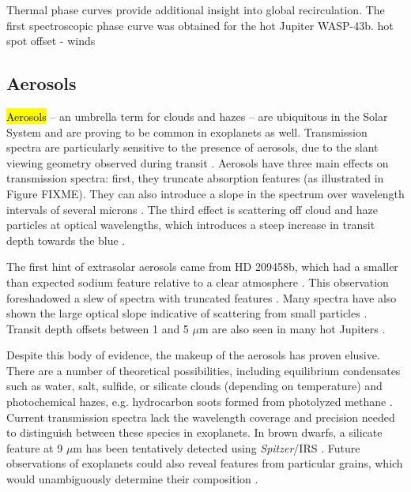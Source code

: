 \documentclass[graybox,natbib,nosecnum]{svmult}
\newcommand{\hbindex}[1]{\hl{#1}\index{#1}}  %
\newcommand{\project}[1]{\textsl{#1}}
\newcommand{\Spitzer}{\project{Spitzer}}
\begin{document}
Thermal phase curves provide additional insight into global recirculation.
The first spectroscopic phase curve was obtained for the hot Jupiter WASP-43b.  
hot spot offset - winds


\subsection{Aerosols}
\hbindex{Aerosols} -- an umbrella term for clouds and hazes -- are ubiquitous in the Solar System and are proving to be common in exoplanets as well. Transmission spectra are particularly sensitive to the presence of aerosols, due to the slant viewing geometry observed during transit \citep{fortney05}.  Aerosols have three main effects on transmission spectra:  first, they truncate absorption features (as illustrated in Figure FIXME).  They can also introduce a slope in the spectrum over wavelength intervals of several microns \citep[e.g][]{sing16}.  The third effect is scattering off cloud and haze particles at optical wavelengths, which introduces a steep increase in transit depth towards the blue \citep[e.g.][]{pont08}.

The first hint of extrasolar aerosols came from HD 209458b, which had a smaller than expected sodium feature relative to a clear atmosphere \citep{charbonneau02}. This observation foreshadowed a slew of spectra with truncated features \citep[e.g.][]{deming13, crossfield13, kreidberg14a, knutson14a, kreidberg15b}. Many spectra have also shown the large optical slope indicative of scattering from small particles \citep[e.g][]{sing11, sing13, robinson14, dragomir15}. Transit depth offsets between 1 and 5 $\mu$m are also seen in many hot Jupiters \citep{sing16}.

Despite this body of evidence, the makeup of the aerosols has proven elusive. There are a number of theoretical possibilities, including equilibrium condensates such as water, salt, sulfide, or silicate clouds (depending on temperature) and photochemical hazes, e.g. hydrocarbon soots formed from photolyzed methane \citep{burrows99, kempton12, morley13, wakeford17}. Current transmission spectra lack the wavelength coverage and precision needed to distinguish between these species in exoplanets.  In brown dwarfs, a silicate feature at 9 $\mu$m has been tentatively detected using \Spitzer/IRS \citep{cushing06}. Future observations of exoplanets could also reveal features from particular grains, which would unambiguously determine their composition \citep{wakeford15}.
\end{document}
